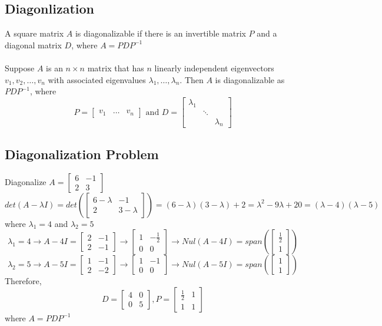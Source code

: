 \begin{enumerate}
\section{Diagonlization}
A square matrix $A$ is diagonalizable if there is an invertible matrix 
$P$ and a diagonal matrix $D$, where $A = PDP^{-1}$ \\\\
Suppose $A$ is an $n \times n$ matrix that has $n$ linearly independent 
eigenvectors $v_1, v_2, \dots, v_n$ with associated eigenvalues 
$\lambda_1, \dots, \lambda_n$. Then $A$ is diagonalizable as 
$PDP^{-1}$, where 
\[
  P = \begin{bmatrix} v_1 & \dots & v_n \end{bmatrix} \text{ and }
  D = \begin{bmatrix} \lambda_1 & & \\ & \ddots & \\ 
  & & \lambda_n \end{bmatrix} 
\]
\subsection{Diagonalization Problem}
Diagonalize $A = \begin{bmatrix} 6 & -1 \\ 2 & 3 \end{bmatrix}$
\[
  det(A - \lambda I) = det(\begin{bmatrix} 
  6 - \lambda & -1 \\ 2 & 3 - \lambda \end{bmatrix}) = (6 - \lambda)(3 - \lambda)
  + 2 = \lambda^2 - 9\lambda + 20 = (\lambda - 4)(\lambda - 5)
\]
where $\lambda_1 = 4$ and $\lambda_2 = 5$ 
\[
  \lambda_1 = 4 \rightarrow A - 4I = \begin{bmatrix} 2 & -1 \\ 
    2 & -1 \end{bmatrix} \rightarrow \begin{bmatrix} 1 & -\frac{1}{2}
    \\ 0 & 0 \end{bmatrix} \rightarrow Nul(A - 4I) = 
    span(\begin{bmatrix} \frac{1}{2} \\ 1 \end{bmatrix})
\]
\[
  \lambda_2 = 5 \rightarrow A - 5I = \begin{bmatrix} 1 & -1 \\ 
    2 & -2 \end{bmatrix} \rightarrow \begin{bmatrix} 1 & -1 \\
    0 & 0 \end{bmatrix} \rightarrow Nul(A - 5I) = span(\begin{bmatrix}
  1 \\ 1 \end{bmatrix})
\]
Therefore, 
\[
  D = \begin{bmatrix} 4 & 0 \\ 0 & 5 \end{bmatrix}, 
  P = \begin{bmatrix} \frac{1}{2} & 1 \\ 1 & 1 \end{bmatrix}
\]
where $A = PDP^{-1}$

\end{enumerate}
